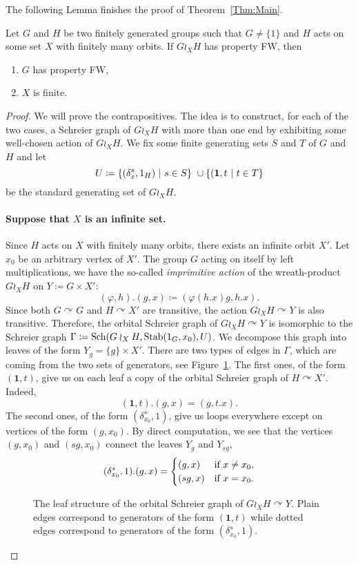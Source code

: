 %
%
The following Lemma finishes the proof of Theorem~\ref{Thm:Main}.
%
%
\begin{lem}\label{Lem:Wreath_groups_ends}
Let $G$ and $H$ be two finitely generated groups such that $G\neq \{1\}$ and $H$ acts on some set $X$ with finitely many orbits.
If $G\wr_XH$ has property FW, then 
\begin{enumerate}
\item $G$ has property FW,
\item $X$ is finite.
\end{enumerate}
\end{lem}
%
%
\begin{proof}
We will prove the contrapositives. The idea is to construct, for each of the two cases, a Schreier graph of $G\wr_XH$ with more than one end by exhibiting some well-chosen action of $G\wr_XH$.
We fix some finite generating sets $S$ and $T$ of $G$ and $H$ and let 
\[
	U\coloneqq\setst{(\delta_x^s,1_H)}{s \in S} \cup \setst{(\mathbf 1,t}{t \in T}
\]
be the standard generating set of $G\wr_XH$.
%
%
%
\paragraph{Suppose that $X$ is an infinite set.}
Since $H$ acts on $X$ with finitely many orbits, there exists an infinite orbit $X'$.
Let $x_0$ be an arbitrary vertex of $X'$.
The group $G$ acting on itself by left multiplications, we have the so-called \emph{imprimitive action} of the wreath-product $G\wr_XH$ on $Y\coloneqq G\times X'$:
\[
	(\varphi,h). (g,x) \coloneqq (\varphi(h.x)g, h.x).
\]
Since both $G\curvearrowright G$ and $H\curvearrowright X'$ are transitive, the action $G\wr_XH\curvearrowright Y$ is also transitive. 
Therefore, the orbital Schreier graph of $G\wr_XH\curvearrowright Y$ is isomorphic to the Schreier graph $\Gamma\coloneqq\operatorname{Sch}(G\wr_XH, \operatorname{Stab}(1_G,x_0), U)$. We decompose this graph into leaves of the form $Y_g = \{ g \} \times X'$. There are two types of edges in $\Gamma$, which are coming from the two sets of generators, see Figure~\ref{Figure:Leaves}. The first ones, of the form $(\mathbf 1,t)$, give us on each leaf a copy of the orbital Schreier graph of $H \curvearrowright X'$. Indeed,
\[
	(\mathbf 1,t).(g,x) = (g, t.x).
\]
The second ones, of the form $(\delta_{x_0}^s,1)$, give us loops everywhere except on vertices of the form $(g,x_0)$. By direct computation, we see that the vertices $(g,x_0)$ and $(sg,x_0)$ connect the leaves $Y_g$ and $Y_{sg}$, 
\[
	(\delta_{x_0}^s,1).(g,x) = 
		\begin{cases}
		(g,x) & \textnormal{if }x \neq x_0, \\
		(sg, x) & \textnormal{if }x = x_0.
		\end{cases}
\]
%
%
\begin{figure}[htbp]\centering
\scalebox{0.7}{
}
\caption{The leaf structure of the orbital Schreier graph of $G\wr_XH \curvearrowright Y$. Plain edges correspond to generators of the form $(\mathbf 1,t)$ while dotted edges correspond to generators of the form $(\delta_{x_0}^s,1)$.}
\label{Figure:Leaves}
\end{figure}
%
%


\end{proof}
